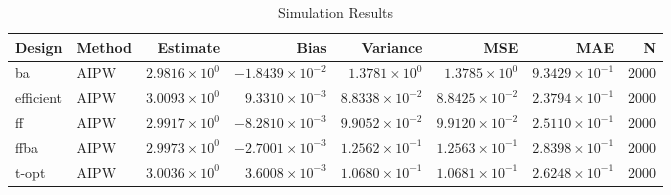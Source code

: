 \begin{table}[ht]
\centering
\begin{tabular}{llrrrrrr}
  \toprule
Design & Method & Estimate & Bias & Variance & MSE & MAE & N \\ 
  \midrule
ba & AIPW & $2.9816 \times 10^{0}$ & $-1.8439 \times 10^{-2}$ & $1.3781 \times 10^{0}$ & $1.3785 \times 10^{0}$ & $9.3429 \times 10^{-1}$ & 2000 \\ 
   \midrule
efficient & AIPW & $3.0093 \times 10^{0}$ & $9.3310 \times 10^{-3}$ & $8.8338 \times 10^{-2}$ & $8.8425 \times 10^{-2}$ & $2.3794 \times 10^{-1}$ & 2000 \\ 
   \midrule
ff & AIPW & $2.9917 \times 10^{0}$ & $-8.2810 \times 10^{-3}$ & $9.9052 \times 10^{-2}$ & $9.9120 \times 10^{-2}$ & $2.5110 \times 10^{-1}$ & 2000 \\ 
   \midrule
ffba & AIPW & $2.9973 \times 10^{0}$ & $-2.7001 \times 10^{-3}$ & $1.2562 \times 10^{-1}$ & $1.2563 \times 10^{-1}$ & $2.8398 \times 10^{-1}$ & 2000 \\ 
   \midrule
t-opt & AIPW & $3.0036 \times 10^{0}$ & $3.6008 \times 10^{-3}$ & $1.0680 \times 10^{-1}$ & $1.0681 \times 10^{-1}$ & $2.6248 \times 10^{-1}$ & 2000 \\ 
   \bottomrule
\end{tabular}
\caption{Simulation Results} 
\label{tab:results}
\end{table}
